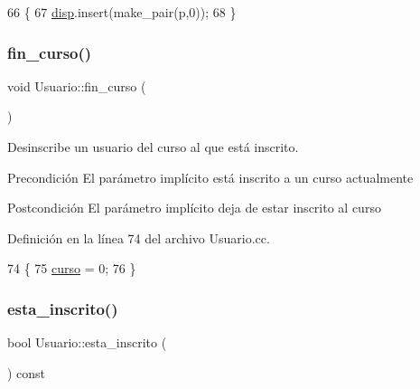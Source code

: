 \begin{DoxyCode}
66                                                          \{
67         \mbox{\hyperlink{class_usuario_a4402178ca5b057733c675e3849718e96}{disp}}.insert(make\_pair(p,0));
68       \}
\end{DoxyCode}
\mbox{\label{class_usuario_a2db0039da08a135391248e34343d1ebd}} 
\subsubsection{\texorpdfstring{fin\+\_\+curso()}{fin\_curso()}}
{\footnotesize\ttfamily void Usuario\+::fin\+\_\+curso (\begin{DoxyParamCaption}{ }\end{DoxyParamCaption})}



Desinscribe un usuario del curso al que está inscrito. 

\begin{DoxyPrecond}{Precondición}
El parámetro implícito está inscrito a un curso actualmente 
\end{DoxyPrecond}
\begin{DoxyPostcond}{Postcondición}
El parámetro implícito deja de estar inscrito al curso 
\end{DoxyPostcond}


Definición en la línea 74 del archivo Usuario.\+cc.


\begin{DoxyCode}
74                               \{
75         \mbox{\hyperlink{class_usuario_aa767fe2d1198f2c97791073bc55803e7}{curso}} = 0;
76       \}
\end{DoxyCode}
\mbox{\label{class_usuario_a35628c962b0db48ebcb85cd2eb186894}} 
\subsubsection{\texorpdfstring{esta\+\_\+inscrito()}{esta\_inscrito()}}
{\footnotesize\ttfamily bool Usuario\+::esta\+\_\+inscrito (\begin{DoxyParamCaption}{ }\end{DoxyParamCaption}) const}



